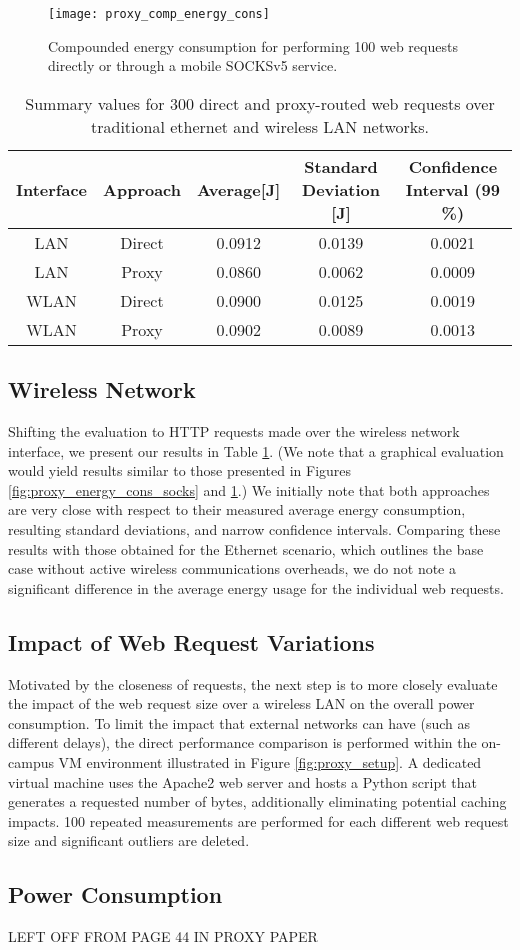 \begin{figure}
\centering
\texttt{[image: proxy\_comp\_energy\_cons]}
\caption{Compounded energy consumption for performing 100 web requests directly or through a mobile SOCKSv5 service.}
\label{fig:proxy_comp_energy_cons}
\end{figure}

\begin{table}[h]
\begin{tabular}{|c|c|c|c|c|}
\hline
 Interface & Approach  & Average[J]  & Standard Deviation [J] & Confidence Interval (99 \%)  \\ \hline
 LAN & Direct & 0.0912 & 0.0139 & 0.0021 \\ \hline
 LAN & Proxy & 0.0860 & 0.0062 & 0.0009 \\ \hline
 WLAN & Direct & 0.0900 & 0.0125 & 0.0019 \\ \hline
 WLAN & Proxy & 0.0902 & 0.0089 & 0.0013 \\ \hline
\end{tabular}
\caption{Summary values for 300 direct and proxy-routed web requests over traditional ethernet and wireless LAN networks.}
\label{tab:requests_summary}
\end{table}

\subsection*{Wireless Network}
Shifting the evaluation to HTTP requests made over the
wireless network interface, we present our results in Table \ref{tab:requests_summary}.
(We note that a graphical evaluation would yield results similar
to those presented in Figures \ref{fig:proxy_energy_cons_socks} and \ref{fig:proxy_comp_energy_cons}.) We initially note that
both approaches are very close with respect to their measured
average energy consumption, resulting standard deviations,
and narrow confidence intervals. \newline
Comparing these results with those obtained for the Ethernet
scenario, which outlines the base case without active wireless
communications overheads, we do not note a significant difference
in the average energy usage for the individual web
requests.

\subsection*{Impact of Web Request Variations}
Motivated by the closeness of requests, the next step is to more
closely evaluate the impact of the web request size over a
wireless LAN on the overall power consumption. To limit
the impact that external networks can have (such as different
delays), the direct performance comparison is performed within
the on-campus VM environment illustrated in Figure \ref{fig:proxy_setup}. A
dedicated virtual machine uses the Apache2 web server and
hosts a Python script that generates a requested number of
bytes, additionally eliminating potential caching impacts. 100 repeated measurements are performed for each different web request size and significant outliers are deleted.

\subsection*{Power Consumption}

LEFT OFF FROM PAGE 44 IN PROXY PAPER